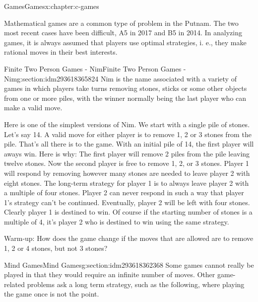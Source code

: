 \documentclass[twoside,10pt,]{book}
\numberwithin{equation}{section}
\begin{document}
\begin{chapterptx}{Games}{}{Games}{}{}{x:chapter:c-games}
\begin{introduction}{}%
Mathematical games are a common type of problem in the Putnam. The two most recent cases have been difficult, A5 in 2017 and B5 in 2014.  In analyzing games, it is  always assumed that players use optimal strategies, i. e., they make rational moves in their best interests.%
\end{introduction}%
%
%
\typeout{************************************************}
\typeout{************************************************}
%
\begin{sectionptx}{Finite Two Person Games - Nim}{}{Finite Two Person Games - Nim}{}{}{g:section:idm293618365824}
%
Nim is the name associated with a variety of games in which players take turns removing stones, sticks or some other objects from one or more piles, with the winner normally being the last player who can make a valid move.%
\par
Here is one of the simplest versions of Nim. We start with a single pile of stones. Let's say 14.  A valid move for either player is to remove 1, 2 or 3 stones from the pile. That's all there is to the game.  With an initial pile of 14, the first player will aways win.  Here is why:  The first player will remove 2 piles from the pile leaving twelve stones.   Now the second player is free to remove 1, 2, or 3 stones.  Player 1 will respond by removing however many stones are needed to leave player 2 with eight stones.  The long-term strategy for player 1 is to always leave player 2 with a multiple of four stones.   Player 2 can never respond in such a way that player 1's strategy can't be continued.  Eventually, player 2 will be left with four stones.   Clearly player 1 is destined to win.   Of course if the starting number of stones is a multiple of 4, it's player 2 who is destined to win using the same strategy.%
\par
Warm-up:  How does the game change if the moves that are allowed are to remove 1, 2 or 4 stones, but not 3 stones?%
\end{sectionptx}
%
%
\typeout{************************************************}
\typeout{************************************************}
%
\begin{sectionptx}{Mind Games}{}{Mind Games}{}{}{g:section:idm293618362368}
Some games cannot really be played in that they would require an infinite number of moves. Other game-related problems ask a long term strategy, such as the following, where playing the game once is not the point.%

\end{sectionptx}
\end{chapterptx}
\end{document}
